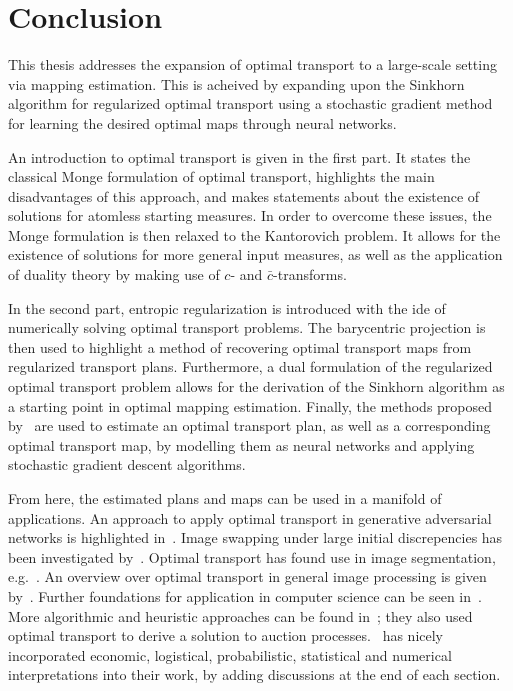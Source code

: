 \chapter*{Conclusion}

This thesis addresses the expansion of optimal transport to a large-scale setting via mapping estimation. This is acheived by expanding upon the Sinkhorn algorithm for regularized optimal transport using a stochastic gradient method for learning the desired optimal maps through neural networks.

An introduction to optimal transport is given in the first part. It states the classical Monge formulation of optimal transport, highlights the main disadvantages of this approach, and makes statements about the existence of solutions for atomless starting measures. In order to overcome these issues, the Monge formulation is then relaxed to the Kantorovich problem. It allows for the existence of solutions for more general input measures, as well as the application of duality theory by making use of $c$- and $\bar{c}$-transforms.

In the second part, entropic regularization is introduced with the ide of numerically solving optimal transport problems. The barycentric projection is then used to highlight a method of recovering optimal transport maps from regularized transport plans. Furthermore, a dual formulation of the regularized optimal transport problem allows for the derivation of the Sinkhorn algorithm as a starting point in optimal mapping estimation. Finally, the methods proposed by\ \cite{Seg2018} are used to estimate an optimal transport plan, as well as a corresponding optimal transport map, by modelling them as neural networks and applying stochastic gradient descent algorithms.

From here, the estimated plans and maps can be used in a manifold of applications. An approach to apply optimal transport in generative adversarial networks is highlighted in\ \cite{Sal2018}. Image swapping under large initial discrepencies has been investigated by\ \cite{Zhu2020}. Optimal transport has found use in image segmentation, e.g.\ \cite{Rabin2015}. An overview over optimal transport in general image processing is given by\ \cite{Papa2015}. Further foundations for application in computer science can be seen in\ \cite{Levy2017}. More algorithmic and heuristic approaches can be found in~\cite{Pey2019}; they also used optimal transport to derive a solution to auction processes.\ \cite{San2015} has nicely incorporated economic, logistical, probabilistic, statistical and numerical interpretations into their work, by adding discussions at the end of each section.


